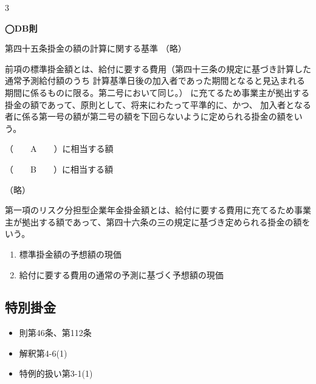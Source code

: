 \begin{answerbox}
  3
\end{answerbox}

\begin{fillblank}[数理人試験 2024 問題4 設問1 A,B]
  \noindent \textbf{◯DB則}
  \begin{lawstructure}
    \begin{lawarticle}{第四十五条}{掛金の額の計算に関する基準}
      （略）

      前項の標準掛金額とは、給付に要する費用（第四十三条の規定に基づき計算した通常予測給付額のうち
      計算基準日後の加入者であった期間となると見込まれる期間に係るものに限る。第二号において同じ。）
      に充てるため事業主が拠出する掛金の額であって、原則として、将来にわたって平準的に、かつ、
      加入者となる者に係る第一号の額が第二号の額を下回らないように定められる掛金の額をいう。

      （　　A　　）に相当する額

      （　　B　　）に相当する額


      （略）
      
      第一項のリスク分担型企業年金掛金額とは、給付に要する費用に充てるため事業主が拠出する額であって、第四十六条の三の規定に基づき定められる掛金の額をいう。
    \end{lawarticle}
  \end{lawstructure}
\end{fillblank}

\begin{answerbox}
    \begin{enumerate}[A: ]
    \item 標準掛金額の予想額の現価
    \item 給付に要する費用の通常の予測に基づく予想額の現価
  \end{enumerate}
\end{answerbox}


\newpage

\subsection{特別掛金}


\begin{InyouJobunbox}
  \begin{itemize}
    \item 則第46条、第112条
    \item 解釈第4-6(1)
    \item 特例的扱い第3-1(1)
  \end{itemize}
\end{InyouJobunbox}

